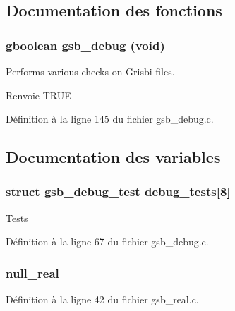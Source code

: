 \subsection{Documentation des fonctions}
\subsubsection[{gsb\_\-debug}]{\setlength{\rightskip}{0pt plus 5cm}gboolean gsb\_\-debug (void)}\label{gsb__debug_8c_a0f8015596839d99fcbdf93c38bc8cf34}
Performs various checks on Grisbi files.

\begin{DoxyReturn}{Renvoie}
TRUE 
\end{DoxyReturn}


Définition à la ligne 145 du fichier gsb\_\-debug.c.



\subsection{Documentation des variables}
\subsubsection[{debug\_\-tests}]{\setlength{\rightskip}{0pt plus 5cm}struct {\bf gsb\_\-debug\_\-test} {\bf debug\_\-tests}[8]}\label{gsb__debug_8c_a524492a56807104a76c1aa5a8a076d1b}
Tests 

Définition à la ligne 67 du fichier gsb\_\-debug.c.

\subsubsection[{null\_\-real}]{ {\bf null\_\-real}}\label{gsb__debug_8c_a26f304bec3fdc0651b9aa8765d4de3c6}


Définition à la ligne 42 du fichier gsb\_\-real.c.

